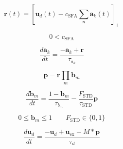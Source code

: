 \documentclass{article}
\begin{document}
\[
\boldsymbol{r}(t) =
\left[
\boldsymbol{u}_d(t) - c_{\text{SFA}} \sum_n \boldsymbol{a}_k(t)
\right]_+
\]

\[
0 < c_{\text{SFA}}
\]

\[
\frac{d \boldsymbol{a}_k}{dt}
= \frac{-\boldsymbol{a}_k + \boldsymbol{r}}{\tau_{a_k}}
\]

\[
\boldsymbol{p} = \boldsymbol{r} \prod_m \boldsymbol{b}_m
\]

\[
\frac{d \boldsymbol{b}_m}{dt}
= \frac{1 - \boldsymbol{b}_m}{\tau_{b_m}} - \frac{F_{\text{STD}}}{\tau_{\text{STD}}} \boldsymbol{p}
\]

\[
0 \leq \boldsymbol{b}_m \leq 1 \qquad F_{\text{STD}} \in \{0, 1\}
\]

\[
\frac{d \boldsymbol{u}_d}{dt}
= \frac{-\boldsymbol{u}_d + \boldsymbol{u}_{\text{ex}} + M * \boldsymbol{p}}{\tau_d}
\]
\end{document}

